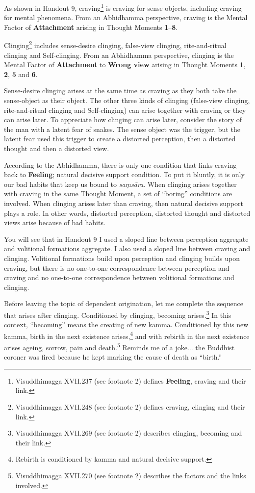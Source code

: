 As shown in Handout 9, craving\footnote{Visuddhimagga XVII.237 (see footnote 2) defines \textbf{Feeling}, craving and their link.} is craving for sense objects, including craving for mental phenomena. From an Abhidhamma perspective, craving is the Mental Factor of \textbf{Attachment} arising in Thought Moments \textbf{1}--\textbf{8}.

Clinging\footnote{Visuddhimagga XVII.248 (see footnote 2) defines craving, clinging and their link.} includes sense-desire clinging, false-view clinging, rite-and-ritual clinging and Self-clinging. From an Abhidhamma perspective, clinging is the Mental Factor of \textbf{Attachment} to \textbf{Wrong view} arising in Thought Moments \textbf{1}, \textbf{2}, \textbf{5} and \textbf{6}.

Sense-desire clinging arises at the same time as craving as they both take the sense-object as their object. The other three kinds of clinging (false-view clinging, rite-and-ritual clinging and Self-clinging) can arise together with craving or they can arise later. To appreciate how clinging can arise later, consider the story of the man with a latent fear of snakes. The sense object was the trigger, but the latent fear used this trigger to create a distorted perception, then a distorted thought and then a distorted view.

According to the Abhidhamma, there is only one condition that links craving back to \textbf{Feeling}; natural decisive support condition. To put it bluntly, it is only our bad habits that keep us bound to \textit{saṃsāra}. When clinging arises together with craving in the same Thought Moment, a set of “boring” conditions are involved. When clinging arises later than craving, then natural decisive support plays a role. In other words, distorted perception, distorted thought and distorted views arise because of bad habits.

You will see that in Handout 9 I used a sloped line between perception aggregate and volitional formations aggregate. I also used a sloped line between craving and clinging. Volitional formations build upon perception and clinging builds upon craving, but there is no one-to-one correspondence between perception and craving and no one-to-one correspondence between volitional formations and clinging.

Before leaving the topic of dependent origination, let me complete the sequence that arises after clinging. Conditioned by clinging, becoming arises.\footnote{Visuddhimagga XVII.269 (see footnote 2) describes clinging, becoming and their link.} In this context, “becoming” means the creating of new kamma. Conditioned by this new kamma, birth in the next existence arises,\footnote{Rebirth is conditioned by kamma and natural decisive support.} and with rebirth in the next existence arises ageing, sorrow, pain and death.\footnote{Visuddhimagga XVII.270 (see footnote 2) describes the factors and the links involved.} Reminds me of a joke... the Buddhist coroner was fired because he kept marking the cause of death as “birth.” 


